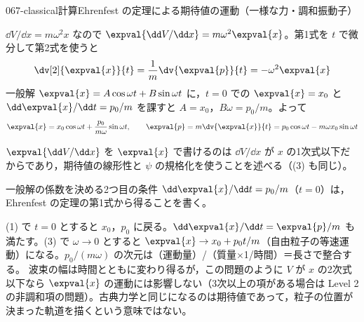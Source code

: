 \documentclass[uplatex,dvipdfmx,a4paper,11pt]{jsarticle}
\begin{document}
\begin{mondai}{067-classical}{計算}{Ehrenfest の定理による期待値の運動（一様な力・調和振動子）}
\begin{tadashii}
 $\dd V/\dd x=m\omega^{2}x$ なので $\expval{\dd V/\dd x}=m\omega^{2}\expval{x}$。第1式を $t$ で微分して第2式を使うと
\[ \dv[2]{\expval{x}}{t}=\frac{1}{m}\dv{\expval{p}}{t}=-\omega^{2}\expval{x} \]
一般解 $\expval{x}=A\cos\omega t+B\sin\omega t$ に，$t=0$ での $\expval{x}=x_{0}$ と $\dd\expval{x}/\dd t=p_{0}/m$ を課すと $A=x_{0}$，$B\omega=p_{0}/m$。よって
\[ \expval{x}=x_{0}\cos\omega t+\frac{p_{0}}{m\omega}\sin\omega t,\qquad \expval{p}=m\dv{\expval{x}}{t}=p_{0}\cos\omega t-m\omega x_{0}\sin\omega t \]
\begin{ronten}
  \item {} $\expval{\dd V/\dd x}$ を $\expval{x}$ で書けるのは $\dd V/\dd x$ が $x$ の1次式以下だからであり，期待値の線形性と $\psi$ の規格化を使うことを述べる（(3) も同じ）。
  \item {} 一般解の係数を決める2つ目の条件 $\dd\expval{x}/\dd t=p_{0}/m$（$t=0$）は，Ehrenfest の定理の第1式から得ることを書く。
\end{ronten}
\kenzan (1) で $t=0$ とすると $x_{0}$，$p_{0}$ に戻る。$\dd\expval{x}/\dd t=\expval{p}/m$ も満たす。(3) で $\omega\to0$ とすると $\expval{x}\to x_{0}+p_{0}t/m$（自由粒子の等速運動）になる。$p_{0}/(m\omega)$ の次元は（運動量）/（質量$\times$1/時間）＝長さで整合する。
\tsumazuki 波束の幅は時間とともに変わり得るが，この問題のように $V$ が $x$ の2次式以下なら $\expval{x}$ の運動には影響しない（3次以上の項がある場合は Level 2 の非調和項の問題）。古典力学と同じになるのは期待値であって，粒子の位置が決まった軌道を描くという意味ではない。
\end{tadashii}
\end{mondai}
\end{document}
